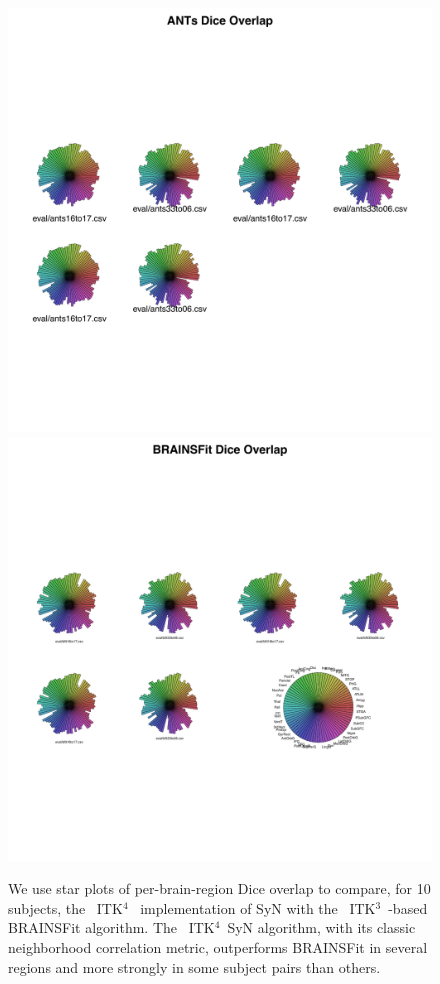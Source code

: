\documentclass{frontiersSCNS}
\newcommand{\tk}{~ITK$^{\text{4}}$~}
\newcommand{\tkt}{~ITK$^{\text{3}}$~}
\begin{document}
\begin{figure}[t]
\begin{center}
\includegraphics[width=6in]{figs/star_ants.pdf}
\includegraphics[width=6in]{figs/star_bfit.pdf}
\caption{We use star plots of
  per-brain-region Dice overlap to compare, for 10 subjects, the \tk
  implementation of SyN with the \tkt-based BRAINSFit algorithm.  The
  \tk SyN algorithm, with its classic neighborhood correlation
  metric, outperforms BRAINSFit in several regions and more strongly
  in some subject pairs than others.}
\label{fig:antsbfit}
\end{center}
\end{figure}
\end{document}
